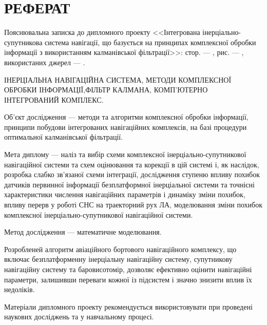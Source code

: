 % 
% 

\section*{РЕФЕРАТ}
Пояснювальна записка до дипломного проекту <<Інтегрована інерціально-супутникова система навігації, що базується на принципах комплексної обробки інформації
з використанням калманівської фільтрації>>: стор. ---   , рис. --- , використаних джерел --- .



ІНЕРЦІАЛЬНА НАВІГАЦІЙНА СИСТЕМА, МЕТОДИ КОМПЛЕКСНОЇ ОБРОБКИ ІНФОРМАЦІЇ,ФІЛЬТР КАЛМАНА, КОМП’ЮТЕРНО ІНТЕГРОВАНИЙ КОМПЛЕКС.

Об’єкт дослідження --- методи та алгоритми комплексної обробки інформації, принципи побудови інтегрованих навігаційних комплексів, на базі процедури
оптимальної калманівської фільтрації.

Мета диплому --- наліз та вибір схеми комплексної інерціально-супутникової 
навігаційної системи та схем оцінювання та корекції в цій системі і, як наслідок, 
розробка слабко зв’язаної схеми інтеграції, дослідження ступеню 
впливу похибок датчиків первинної інформації  безплатформної інерціальної системи 
та точнісні характеристики числення навігаційних параметрів і динаміку зміни похибок, 
впливу перерв у роботі СНС на траекторний рух ЛА, моделювання зміни похибок 
комплексної інерціально-супутникової навігаційної системи.

Метод дослідження --- математичне моделювання.

Розробленей алгоритм авіаційного бортового навігаційного комплексу, що включає безплатформенну інерціальну навігаційну
систему, супутникову навігаційну систему та баровисотомір, дозволяє ефективно оцінити навігаційні параметри, залишивши
переваги кожної із підсистем і значно знизити вплив їх недоліків.

Матеріали дипломного проекту рекомендується використовувати при проведені наукових досліджень та 
у навчальному процесі.

%
